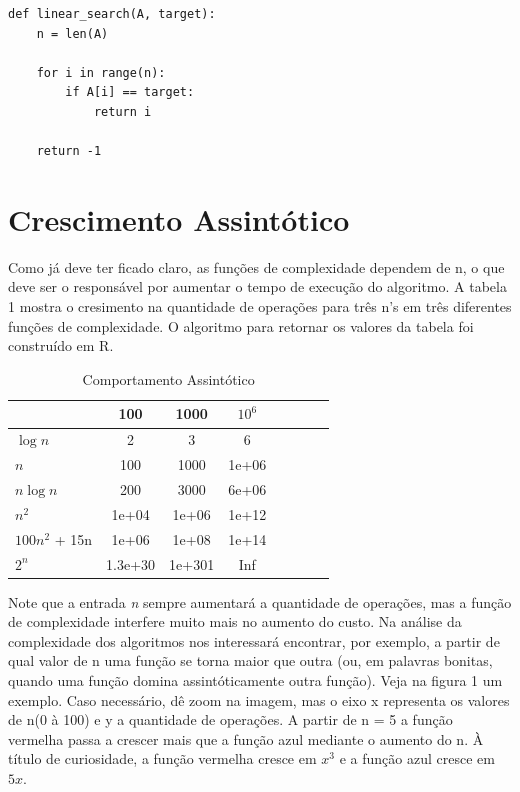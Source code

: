 \documentclass[ a4paper, twocolumn]{article}
\theoremstyle{definition}
\begin{document}
\begin{lstlisting}[label=linear_search,caption= Busca sequêncial]
def linear_search(A, target):
    n = len(A)

    for i in range(n):
        if A[i] == target:
            return i
    
    return -1
\end{lstlisting}

\section{Crescimento Assintótico}
Como já deve ter ficado claro, as funções de complexidade dependem de n, o que deve ser o responsável por aumentar o tempo de execução do algoritmo. A tabela 1 mostra o cresimento na quantidade de operações para três n's em três diferentes funções de complexidade. O algoritmo para retornar os valores da tabela foi construído em R.

\begin{table}[H]
\caption{\label{tab:crescimento}Comportamento Assintótico}
\begin{tabular}{l*{6}{c}r}
	 & 100 & 1000 & $10^6$ \\
	\hline
	$\log n$ & 2 & 3 & 6 \\
	$n$ & 100 & 1000 & 1e+06 \\
	$n \log n$ & 200 & 3000 & 6e+06 \\
	$n^2$ & 1e+04 & 1e+06 & 1e+12 \\
	$100n^2$ + 15n & 1e+06 & 1e+08 & 1e+14 \\
	$2^{n}$ & 1.3e+30 & 1e+301 & Inf \\
\end{tabular}
\end{table}

Note que a entrada \textit{n} sempre aumentará a quantidade de operações, mas a função de complexidade interfere muito mais no aumento do custo. Na análise da complexidade dos algoritmos nos interessará encontrar, por exemplo, a partir de qual valor de n uma função se torna maior que outra (ou, em palavras bonitas, quando uma função domina assintóticamente outra função). Veja na figura 1 um exemplo. Caso necessário, dê zoom na imagem, mas o eixo x representa os valores de n(0 à 100) e y a quantidade de operações. A partir de n = 5 a função vermelha passa a crescer mais que a função azul mediante o aumento do n. À título de curiosidade, a função vermelha cresce em $x^3$ e a função azul cresce em $5x$.
\end{document}
